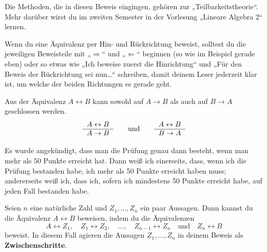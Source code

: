 \begin{bem}
    Die Methoden, die in diesen Beweis eingingen, gehören zur „Teilbarkeitstheorie“. Mehr darüber wirst du im zweiten Semester in der Vorlesung „Lineare Algebra 2“ lernen.
\end{bem}


\begin{bem}[Signalwörter]
    Wenn du eine Äquivalenz per Hin- und Rückrichtung beweist, solltest du die jeweiligen Beweisteile mit „$\Rightarrow$“ und „$\Leftarrow$“ beginnen (so wie im Beispiel gerade eben) oder so etwas wie „Ich beweise zuerst die Hinrichtung“ und „Für den Beweis der Rückrichtung sei nun\dots“ schreiben, damit deinem Leser jederzeit klar ist, um welche der beiden Richtungen es gerade geht.
\end{bem}


\begin{axiom}
    Aus der Äquivalenz $A\leftrightarrow B$ kann sowohl auf $A\to B$ als auch auf $B\to A$ geschlossen werden.
    \[\begin{tabular}{r}
        $A\leftrightarrow B$ \\
        \hline 
        $A\to B$ 
    \end{tabular} \qquad\text{und}\qquad \begin{tabular}{r}
        $A\leftrightarrow B$ \\
        \hline 
        $B\to A$ 
    \end{tabular}\]
\end{axiom}


\begin{bsp}
    Es wurde angekündigt, dass man die Prüfung genau dann besteht, wenn man mehr als 50 Punkte erreicht hat. Dann weiß ich einerseits, dass, wenn ich die Prüfung bestanden habe, ich mehr als 50 Punkte erreicht haben muss; andererseits weiß ich, dass ich, sofern ich mindestens 50 Punkte erreicht habe, auf jeden Fall bestanden habe.
\end{bsp}


\begin{satz} \label{ifftrans}
    Seien $n$ eine natürliche Zahl und $Z_1,\dots , Z_n$ ein paar Aussagen. Dann kannst du die Äquivalenz $A\leftrightarrow B$ beweisen, indem du die Äquivalenzen
        \[ A\leftrightarrow Z_1,\quad Z_1\leftrightarrow Z_2,\quad \dots,\quad Z_{n-1}\leftrightarrow Z_n \quad\text{und}\quad Z_n\leftrightarrow B \]
    beweist. In diesem Fall agieren die Aussagen $Z_1,\dots , Z_n$ in deinem Beweis als \textbf{Zwischenschritte}.
\end{satz}


